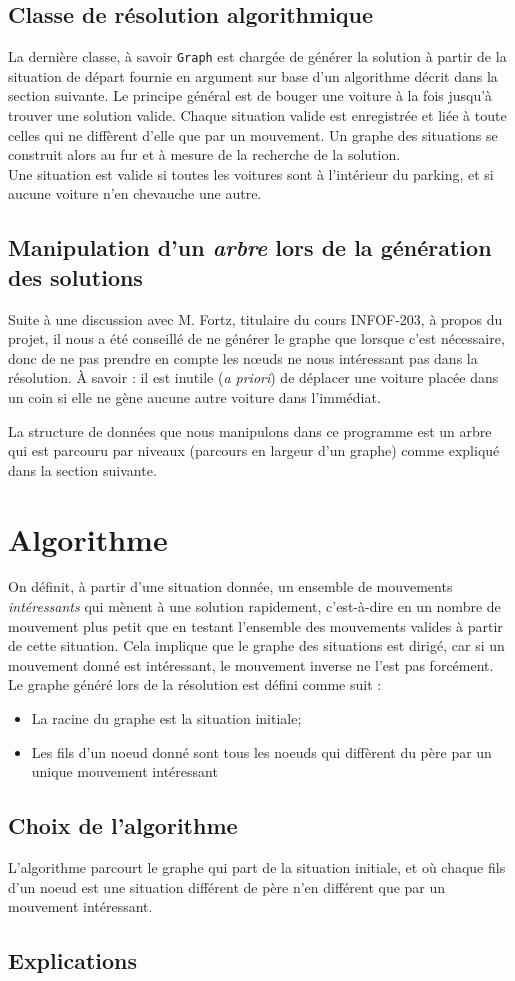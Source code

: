 \documentclass{article}
\begin{document}
    \subsection{Classe de résolution algorithmique}
        La dernière classe, à savoir \texttt{Graph} est chargée de générer la solution à partir de la situation de départ fournie en argument
        sur base d'un algorithme décrit dans la section suivante. Le principe général est de bouger une voiture à la fois jusqu'à trouver une
		solution valide. Chaque situation valide est enregistrée et liée à toute celles qui ne diffèrent d'elle que par un mouvement.
		Un graphe des situations se construit alors au fur et à mesure de la recherche de la solution.\\
		Une situation est valide si toutes les voitures sont à l'intérieur du parking, et si aucune voiture n'en chevauche une autre.

    \subsection{Manipulation d'un \textit{arbre} lors de la génération des solutions}
        Suite à une discussion avec M. Fortz, titulaire du cours INFOF-203, à propos du projet, il nous a été conseillé de ne générer le graphe
        que lorsque c'est nécessaire, donc de ne pas prendre en compte les nœuds ne nous intéressant pas dans la résolution. À savoir : il est
        inutile (\textit{a priori}) de déplacer une voiture placée dans un coin si elle ne gène aucune autre voiture dans l'immédiat.

        La structure de données que nous manipulons dans ce programme est un arbre qui est parcouru par niveaux (parcours en largeur d'un graphe)
        comme expliqué dans la section suivante.

\section{Algorithme}
		On définit, à partir d'une situation donnée, un ensemble de mouvements \textit{intéressants} qui mènent
		à une solution rapidement, c'est-à-dire en un nombre de mouvement plus petit que en testant l'ensemble des mouvements valides à
		partir de cette situation. Cela implique que le graphe des situations est dirigé, car si un mouvement donné est intéressant,
		le mouvement inverse ne l'est pas forcément. \\
		Le graphe généré lors de la résolution est défini comme suit :
		\begin{itemize}
			\item La racine du graphe est la situation initiale;
			\item Les fils d'un noeud donné sont tous les noeuds qui diffèrent du père par un unique mouvement intéressant
		\end{itemize}
    \subsection{Choix de l'algorithme}
		L'algorithme parcourt le graphe qui part de la situation initiale, et où chaque fils d'un noeud est une situation différent
		de père n'en différent que par un mouvement intéressant.
    \subsection{Explications}
\end{document}
